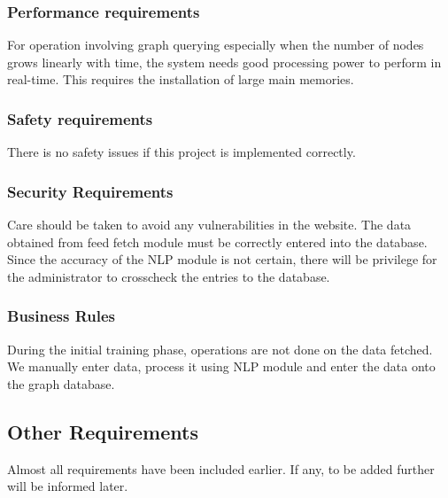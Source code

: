 \subsubsection{Performance requirements}
For operation involving graph querying especially when the number of nodes grows linearly with time, the system needs good processing power to perform in real-time. This requires  the installation of large main memories.

\subsubsection{Safety requirements}
\par There is no safety issues if this project is implemented correctly.
\subsubsection{Security Requirements}
\par Care should be taken to avoid any vulnerabilities in the website. The data obtained from feed fetch module must be correctly entered into the database. Since the accuracy of the NLP module is not certain, there will be privilege for the administrator to crosscheck the entries to the database.
\subsubsection{Business Rules}
\par During the initial training phase, operations are not done on the data fetched. We manually enter data, process it using NLP module and enter the data onto the graph database.

\subsection{Other Requirements}
\par Almost all requirements have been included earlier. If any, to be added further will be informed later.